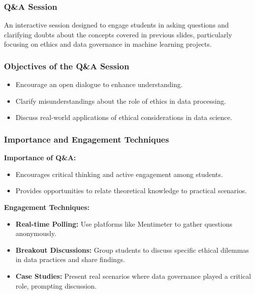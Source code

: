 \documentclass[aspectratio=169]{beamer}
\begin{document}
\begin{frame}[fragile]
  \frametitle{Q\&A Session}
  An interactive session designed to engage students in asking questions and clarifying doubts about the concepts covered in previous slides, particularly focusing on ethics and data governance in machine learning projects.
\end{frame}

\begin{frame}[fragile]
  \frametitle{Objectives of the Q\&A Session}
  \begin{itemize}
    \item Encourage an open dialogue to enhance understanding.
    \item Clarify misunderstandings about the role of ethics in data processing.
    \item Discuss real-world applications of ethical considerations in data science.
  \end{itemize}
\end{frame}

\begin{frame}[fragile]
  \frametitle{Importance and Engagement Techniques}
  \textbf{Importance of Q\&A:}
  \begin{itemize}
    \item Encourages critical thinking and active engagement among students.
    \item Provides opportunities to relate theoretical knowledge to practical scenarios.
  \end{itemize}

  \textbf{Engagement Techniques:}
  \begin{itemize}
    \item \textbf{Real-time Polling:} Use platforms like Mentimeter to gather questions anonymously.
    \item \textbf{Breakout Discussions:} Group students to discuss specific ethical dilemmas in data practices and share findings.
    \item \textbf{Case Studies:} Present real scenarios where data governance played a critical role, prompting discussion.
  \end{itemize}
\end{frame}
\end{document}
